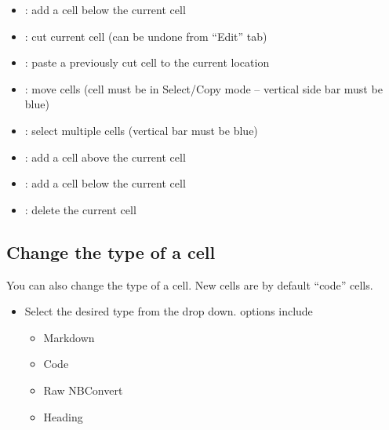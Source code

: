 \documentclass[letterpaper,10pt,english]{jupyterBook}
\begin{document}
\sphinxAtStartPar
{}
\begin{itemize}
\item {} 
\sphinxAtStartPar
{}: add a cell below the current cell

\item {} 
\sphinxAtStartPar
{}: cut  current cell (can be undone from “Edit” tab)

\item {} 
\sphinxAtStartPar
{}: paste a previously cut cell to the current location

\item {} 
\sphinxAtStartPar
{}: move cells (cell must be in Select/Copy mode – vertical side bar must be blue)

\item {} 
\sphinxAtStartPar
{}: select multiple cells (vertical bar must be blue)

\end{itemize}

\sphinxAtStartPar
{}
\begin{itemize}
\item {} 
\sphinxAtStartPar
{}: add a cell above the current cell

\item {} 
\sphinxAtStartPar
{}: add a cell below the current cell

\item {} 
\sphinxAtStartPar
{}: delete the current cell

\end{itemize}


\subsection{Change the type of a cell}
\label{\detokenize{content/04_PythonEssentials/Intro_Jupyter_notebook:change-the-type-of-a-cell}}
\sphinxAtStartPar
You can also change the type of a cell. New cells are by default “code” cells.

\sphinxAtStartPar
{}
\begin{itemize}
\item {} 
\sphinxAtStartPar
Select the desired type from the drop down.  options include
\begin{itemize}
\item {} 
\sphinxAtStartPar
Markdown

\item {} 
\sphinxAtStartPar
Code

\item {} 
\sphinxAtStartPar
Raw NBConvert

\item {} 
\sphinxAtStartPar
Heading

\end{itemize}

\end{itemize}
\end{document}
